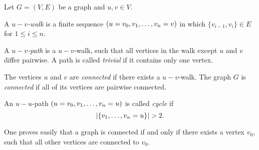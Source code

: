 \begin{defin}
Let $G=(V,E)$ be a graph and $u,v\in V$.
\begin{thmlist}
\item A \emph{$u-v$-walk} is a finite sequence $(u=v_0,v_{1},\ldots,v_{n}=v)$ in which $\lbrace v_{i-1},v_i\rbrace\in E$ for $1\leq i\leq n$.
\item A \emph{$u-v$-path} is a $u-v$-walk, such that all vertices in the walk except $u$ and $v$ differ pairwise. A path is called \emph{trivial} if it contains only one vertex.
\item The vertices $u$ and $v$ are \textit{connected} if there exists a $u-v$-walk. The graph $G$ is \emph{connected} if all of its vertices are pairwise connected.
\item An $u-u$-path $(u=v_0,v_{1},\ldots,v_{n}=u)$ is called \emph{cycle} if 
\[|\lbrace\seq{v}=u\rbrace|>2.\]
\end{thmlist}
\end{defin}

\begin{rem}
One proves easily that a graph is connected if and only if there exists a vertex $v_0$, such that all other vertices are connected to $v_0$.
\end{rem}

